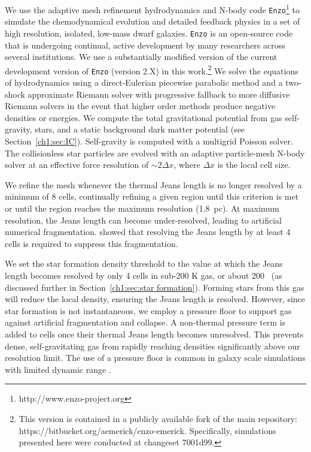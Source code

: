 We use the adaptive mesh refinement hydrodynamics and N-body code \texttt{Enzo}\footnote{http://www.enzo-project.org} to simulate the chemodynamical evolution and detailed feedback physics in a set of high resolution, isolated, low-mass dwarf galaxies. \texttt{Enzo} is an open-source code that is undergoing continual, active development by many researchers across several institutions. We use a substantially modified version of the current development version of \texttt{Enzo} (version 2.X) in this work.\footnote{This version is contained in a publicly available fork of the main repository: https://bitbucket.org/aemerick/enzo-emerick. Specifically, simulations presented here were conducted at changeset 7001d99.} We solve the equations of hydrodynamics using a direct-Eulerian piecewise parabolic method \citep{ColellaWoodward1984, Bryan1995} and a two-shock approximate Riemann solver with progressive fallback to more diffusive Riemann solvers in the event that higher order methods produce negative densities or energies. We compute the total gravitational potential from gas self-gravity, stars, and a static background dark matter potential (see Section~\ref{ch1:sec:IC}). Self-gravity is computed with a multigrid Poisson solver. The collisionless star particles are evolved with an adaptive particle-mesh N-body solver at an effective force resolution of $\sim 2 \Delta x$, where $\Delta x$ is the local cell size.

We refine the mesh whenever the thermal Jeans length is no longer resolved by a minimum of 8 cells, continually refining a given region until this criterion is met or until the region reaches the maximum resolution (1.8~pc). At maximum resolution, the Jeans length can become under-resolved, leading to artificial numerical fragmentation. \citet{Truelove1997} showed that resolving the Jeans length by at least 4 cells is required to suppress this fragmentation.

We set the star formation density threshold to the value at which the Jeans length becomes resolved by only 4 cells in sub-200 K gas, or about 200 \ccunit~(as discussed further in Section~\ref{ch1:sec:star formation}). Forming stars from this gas will reduce the local density, ensuring the Jeans length is resolved. However, since star formation is not instantaneous, we employ a pressure floor to support gas against artificial fragmentation and collapse. A non-thermal pressure term is added to cells once their thermal Jeans length becomes unresolved. This prevents dense, self-gravitating gas from rapidly reaching densities significantly above our resolution limit. The use of a pressure floor is common in galaxy scale simulations with limited dynamic range \citep[e.g][]{Machacek2001, 2008ApJ...680.1083R}.

